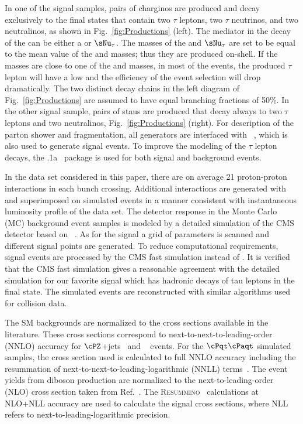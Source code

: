 In one of the signal samples, pairs of charginos are produced and decay exclusively to the final states that contain 
two $\tau$ leptons, two $\tau$ neutrinos, and two neutralinos, as shown in Fig.~\ref{fig:Productions} (left). 
The mediator in the decay of the \chione can be either a \sTau or $\sNu_{\tau}$. 
The masses of the \sTau and $\sNu_{\tau}$ are set to be equal to the mean value of the \chione and \PSGczDo masses; thus they are produced on-shell. 
If the masses are close to one of the \chione and \PSGczDo masses, in most of the events, the produced $\tau$ lepton will have a low \pt 
and the efficiency of the event selection will drop dramatically.
The two distinct decay chains in the left diagram of Fig.~\ref{fig:Productions} 
are assumed to have equal branching fractions of 50\%. 
In the other signal sample, pairs of staus are produced that decay always to two $\tau$ leptons and two neutralinos, Fig.~\ref{fig:Productions} (right). 
For description of the parton shower and fragmentation, all generators are interfaced with ~\cite{Sjostrand:2006za}, 
which is also used to generate signal events. To improve the modeling of the $\tau$ lepton decays, 
 the .1a~\cite{Davidson:2010rw} package is used for both signal and background events. 


In the data set considered in this paper,
there are on average 21 proton-proton interactions in each bunch crossing.
Additional interactions are generated with \PYTHIA and superimposed on simulated events in a manner consistent with 
 instantaneous luminosity profile of the data set.
The detector response in the  Monte Carlo (MC) background event samples is modeled by a
detailed simulation
of the CMS detector based on {\GEANTfour}~\cite{Agostinelli:2002hh}.  
As for the signal a grid of parameters is scanned and different signal points are generated. To reduce  computational requirements, signal events 
are processed by the CMS fast simulation \cite{Abdullin:2011zz} instead of {\GEANTfour}. 
It is verified that the CMS fast simulation gives a reasonable agreement with the detailed simulation for our favorite signal which has hadronic decays of 
tau leptons in the final state.
The simulated events are reconstructed with similar algorithms used for collision data.

The SM backgrounds are normalized to the cross sections available 
in the literature. These cross sections correspond to next-to-next-to-leading-order (NNLO) accuracy for $\cPZ$+jets~\cite{Melnikov:2006kv} 
and \wjets~\cite{xsec_WZ} events. For the $\cPqt\cPaqt$ simulated samples, the cross section used is calculated to full NNLO accuracy including
the resummation of next-to-next-to-leading-logarithmic (NNLL) terms~\cite{Czakon:2011xx}. %
The event yields from diboson production are normalized to the next-to-leading-order (NLO) cross section  taken from Ref.~\cite{Campbell:2011bn}. 
The \textsc{Resummino}~\cite{Fuks:2012qx,Fuks:2013vua,Fuks:2013lya} calculations at NLO+NLL accuracy are used to calculate the signal cross sections, where 
NLL refers to next-to-leading-logarithmic precision.
